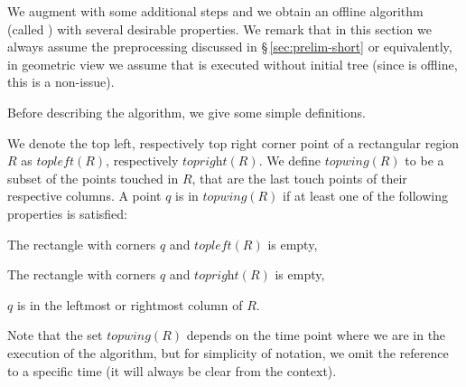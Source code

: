 





We augment \greedy with some additional steps and we obtain an offline algorithm (called \agreedy) with several desirable properties. We remark that in this section we always assume the preprocessing discussed in \S\,\ref{sec:prelim-short} or equivalently, in geometric view we assume that \agreedy is executed without initial tree (since \agreedy is offline, this is a non-issue).

Before describing the algorithm, we give some simple definitions.

We denote the top left, respectively top right corner point of a rectangular region $R$ as $\textit{topleft}(R)$, respectively $\textit{topright}(R)$. We define $\textit{topwing}(R)$ to be a subset of the points touched in $R$, that are the last touch points of their respective columns. A point $q$ is in $\textit{topwing}(R)$ if at least one of the following properties is satisfied:  %
\begin{compactenum}[--]
\item The rectangle with corners $q$ and $\textit{topleft}(R)$ is empty,  
\item The rectangle with corners $q$ and $\textit{topright}(R)$ is empty,  
\item $q$ is in the leftmost or rightmost column of $R$.
\end{compactenum}
Note that the set $\textit{topwing}(R)$ depends on the time point where we are in the execution of the algorithm, but for simplicity of notation, we omit the reference to a specific time (it will always be clear from the context).


